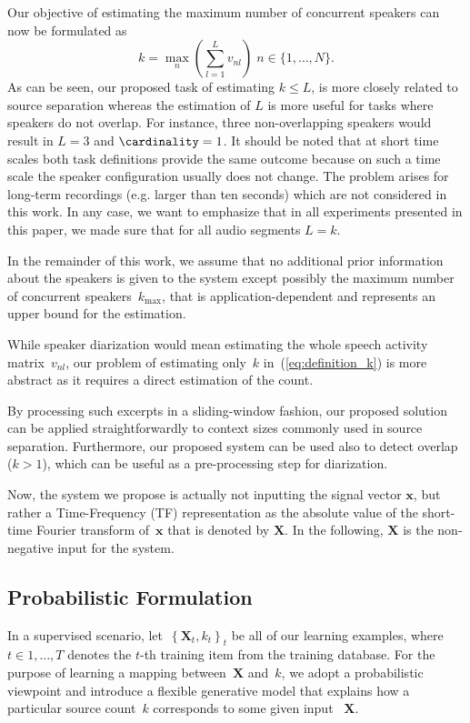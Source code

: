 Our objective of estimating the maximum number of concurrent speakers can now be formulated as
%
\begin{equation}
k=\underset{n}{\max}\left(\sum_{l = 1}^{L} v_{nl}\right) \; n \in \{ 1,\ldots, N \}
\label{eq:definition_k}.
\end{equation}
%
As can be seen, our proposed task of estimating $k\leq L$, is more closely related to source separation whereas the estimation of \(L\) is more useful for tasks where speakers do not overlap.
For instance, three non-overlapping speakers would result in \(L = 3\) and \(\cardinality = 1\).
It should be noted that at short time scales both task definitions provide the same outcome because on such a time scale the speaker configuration usually does not change. The problem arises for long-term recordings (e.g. larger than ten seconds) which are not considered in this work.
In any case, we want to emphasize that in all experiments presented in this paper, we made sure that for all audio segments $L = k$.
\par
In the remainder of this work, we assume that no additional prior information about the speakers is given to the system except possibly the maximum number of concurrent speakers~$k_{\max}$, that is application-dependent and represents an upper bound for the estimation.

While speaker diarization would mean estimating the whole speech activity matrix~$v_{nl}$, our problem of estimating only~$k$ in~(\ref{eq:definition_k}) is more abstract as it requires a direct estimation of the count.

By processing such excerpts in a sliding-window fashion, our proposed solution can be applied straightforwardly to context sizes commonly used in source separation.
Furthermore, our proposed system can be used also to detect overlap ($k > 1$), which can be useful as a pre-processing step for diarization.

Now, the system we propose is actually not inputting the signal vector $\mathbf{x}$, but rather a Time-Frequency (TF) representation as the absolute value of the short-time Fourier transform of~$\mathbf{x}$ that is denoted by $\mathbf{X}$.
In the following, $\mathbf{X}$ is the non-negative input for the system.

\subsection{Probabilistic Formulation}%
\label{ssec:model}
In a supervised scenario, let~$ \left\{\mathbf{X}_t,k_t\right\}_t$ be all of our learning examples, where~$t \in{1,\dots,T}$ denotes the $t$-th training item from the training database.
For the purpose of learning a mapping between~$\mathbf{X}$ and~$k$, we adopt a probabilistic viewpoint and introduce a flexible generative model that explains how a particular source count~$k$ corresponds to some given input ~$\mathbf{X}$.

